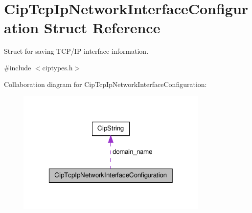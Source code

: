 \hypertarget{structCipTcpIpNetworkInterfaceConfiguration}{\section{\-Cip\-Tcp\-Ip\-Network\-Interface\-Configuration \-Struct \-Reference}
\label{d0/d4c/structCipTcpIpNetworkInterfaceConfiguration}
}


\-Struct for saving \-T\-C\-P/\-I\-P interface information.  




{\ttfamily \#include $<$ciptypes.\-h$>$}



\-Collaboration diagram for \-Cip\-Tcp\-Ip\-Network\-Interface\-Configuration\-:
\nopagebreak
\begin{figure}[H]
\begin{center}
\leavevmode
\includegraphics[width=268pt]{d6/d54/structCipTcpIpNetworkInterfaceConfiguration__coll__graph}
\end{center}
\end{figure}
